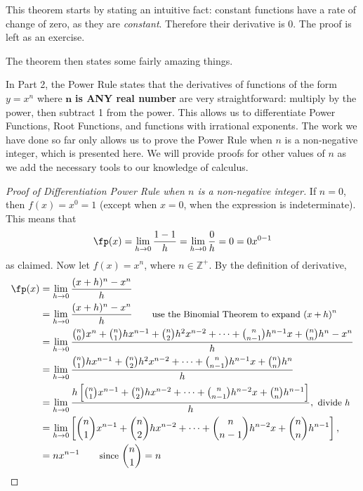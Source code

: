 This theorem starts by stating an intuitive fact: constant functions have a rate of change of zero, as they are \textit{constant}. Therefore their derivative is 0. The proof is left as an exercise.

The theorem then states some fairly amazing things.

In Part 2, the Power Rule states that the derivatives of functions of the form $y=x^n$ where $\mathbf{n}$ \textbf{is ANY real number} are very straightforward: multiply by the power, then subtract 1 from the power. This allows us to differentiate Power Functions, Root Functions, and functions with irrational exponents. The work we have done so far only allows us to prove the Power Rule when $n$ is a non-negative integer, which is presented here. We will provide proofs for other values of $n$ as we add the necessary tools to our knowledge of calculus.

\begin{proof}[Proof of Differentiation Power Rule when $n$ is a non-negative integer]
If $n=0$, then $f(x)=x^0=1$ (except when $x=0$, when the expression is indeterminate).  This means that
\[\fp(x)=\lim_{h\to0}\frac{1-1}h=\lim_{h\to0}\frac0h=0=0x^{0-1}\]
as claimed.  Now let $f(x)= x^n$, where $n \in \mathbb{Z}^+$. By the definition of derivative,
\begin{align*}
\fp(x)
&= \lim_{h\to 0} \dfrac{(x+h)^n - x^n}{h} \\
&= \lim_{h\to 0} \dfrac{(x+h)^n - x^n}{h} \qquad\text{\small use the Binomial Theorem to expand $(x+h)^n$} \\
&=\lim_{h\to 0} \dfrac{\binom{n}{0}x^n + \binom{n}{1} hx^{n-1} + \binom{n}{2} h^2x^{n-2}+ \dotsb +\binom{n}{n-1} h^{n-1}x + \binom {n}{n} h^n  -x^n}{h} \\
&= \lim_{h\to 0} \dfrac{\binom{n}{1} hx^{n-1} + \binom{n}{2} h^2x^{n-2}+ \dotsb +\binom{n}{n-1} h^{n-1}x + \binom{n}{n} h^n}{h} \\
&= \lim_{h\to 0} \dfrac{h\left[\binom{n}{1} x^{n-1} + \binom{n}{2} h x^{n-2}+ \dotsb +\binom{n}{n-1} h^{n-2}x + \binom {n}{n} h^{n-1}\right]}{h},\text{\small~divide $h$}\\
&= \lim_{h\to 0}\left[\dbinom{n}{1} x^{n-1} + \dbinom{n}{2} h x^{n-2}+ \dotsb +\dbinom{n}{n-1} h^{n-2}x + \dbinom {n}{n} h^{n-1}\right],\\
&=  n x^{n-1} \qquad\text{\small since } \dbinom{n}{1} = n \qedhere
\end{align*}%
\end{proof}

